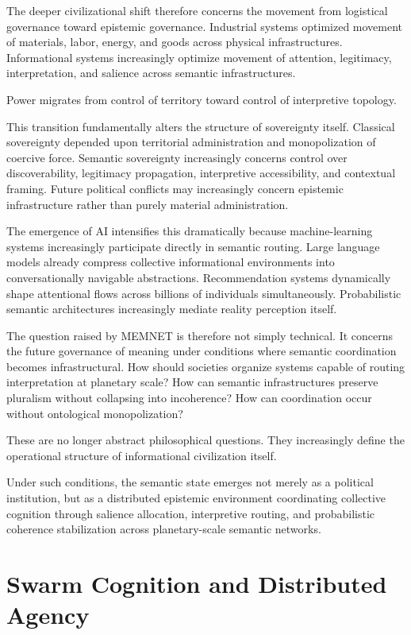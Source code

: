 \documentclass[11pt,a4paper]{article}
\begin{document}
The deeper civilizational shift therefore concerns the movement from logistical governance toward epistemic governance. Industrial systems optimized movement of materials, labor, energy, and goods across physical infrastructures. Informational systems increasingly optimize movement of attention, legitimacy, interpretation, and salience across semantic infrastructures.

Power migrates from control of territory toward control of interpretive topology.

This transition fundamentally alters the structure of sovereignty itself. Classical sovereignty depended upon territorial administration and monopolization of coercive force. Semantic sovereignty increasingly concerns control over discoverability, legitimacy propagation, interpretive accessibility, and contextual framing. Future political conflicts may increasingly concern epistemic infrastructure rather than purely material administration.

The emergence of AI intensifies this dramatically because machine-learning systems increasingly participate directly in semantic routing. Large language models already compress collective informational environments into conversationally navigable abstractions. Recommendation systems dynamically shape attentional flows across billions of individuals simultaneously. Probabilistic semantic architectures increasingly mediate reality perception itself.

The question raised by MEMNET is therefore not simply technical. It concerns the future governance of meaning under conditions where semantic coordination becomes infrastructural. How should societies organize systems capable of routing interpretation at planetary scale? How can semantic infrastructures preserve pluralism without collapsing into incoherence? How can coordination occur without ontological monopolization?

These are no longer abstract philosophical questions. They increasingly define the operational structure of informational civilization itself.

Under such conditions, the semantic state emerges not merely as a political institution, but as a distributed epistemic environment coordinating collective cognition through salience allocation, interpretive routing, and probabilistic coherence stabilization across planetary-scale semantic networks.

\section{Swarm Cognition and Distributed Agency}
\end{document}
